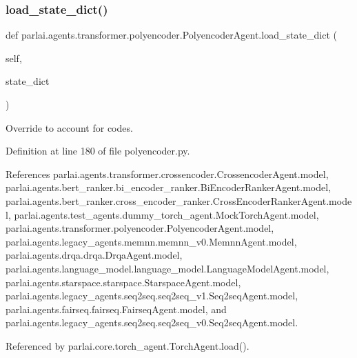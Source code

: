 \subsubsection{\texorpdfstring{load\+\_\+state\+\_\+dict()}{load\_state\_dict()}}
{\footnotesize\ttfamily def parlai.\+agents.\+transformer.\+polyencoder.\+Polyencoder\+Agent.\+load\+\_\+state\+\_\+dict (\begin{DoxyParamCaption}\item[{}]{self,  }\item[{}]{state\+\_\+dict }\end{DoxyParamCaption})}

\begin{DoxyVerb}Override to account for codes.\end{DoxyVerb}
 

Definition at line 180 of file polyencoder.\+py.



References parlai.\+agents.\+transformer.\+crossencoder.\+Crossencoder\+Agent.\+model, parlai.\+agents.\+bert\+\_\+ranker.\+bi\+\_\+encoder\+\_\+ranker.\+Bi\+Encoder\+Ranker\+Agent.\+model, parlai.\+agents.\+bert\+\_\+ranker.\+cross\+\_\+encoder\+\_\+ranker.\+Cross\+Encoder\+Ranker\+Agent.\+model, parlai.\+agents.\+test\+\_\+agents.\+dummy\+\_\+torch\+\_\+agent.\+Mock\+Torch\+Agent.\+model, parlai.\+agents.\+transformer.\+polyencoder.\+Polyencoder\+Agent.\+model, parlai.\+agents.\+legacy\+\_\+agents.\+memnn.\+memnn\+\_\+v0.\+Memnn\+Agent.\+model, parlai.\+agents.\+drqa.\+drqa.\+Drqa\+Agent.\+model, parlai.\+agents.\+language\+\_\+model.\+language\+\_\+model.\+Language\+Model\+Agent.\+model, parlai.\+agents.\+starspace.\+starspace.\+Starspace\+Agent.\+model, parlai.\+agents.\+legacy\+\_\+agents.\+seq2seq.\+seq2seq\+\_\+v1.\+Seq2seq\+Agent.\+model, parlai.\+agents.\+fairseq.\+fairseq.\+Fairseq\+Agent.\+model, and parlai.\+agents.\+legacy\+\_\+agents.\+seq2seq.\+seq2seq\+\_\+v0.\+Seq2seq\+Agent.\+model.



Referenced by parlai.\+core.\+torch\+\_\+agent.\+Torch\+Agent.\+load().

